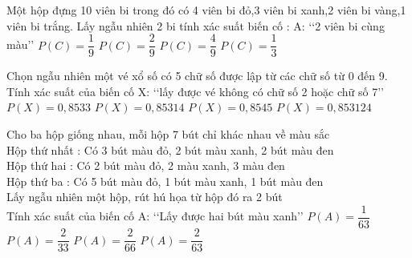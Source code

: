 \begin{ex}
Một hộp đựng 10 viên bi trong đó có 4 viên bi đỏ,3 viên bi xanh,2 viên bi vàng,1 viên bi trắng. Lấy ngẫu nhiên 2 bi tính xác suất biến cố : A: \lq\lq 2 viên bi cùng màu\rq\rq 
\choice
{$P(C)=\dfrac{1}{9}$}
{\True $P(C)=\dfrac{2}{9}$}
{$P(C)=\dfrac{4}{9}$}
{$P(C)=\dfrac{1}{3}$}
\end{ex}
\begin{ex}
Chọn ngẫu nhiên một vé xổ số có 5 chữ số được lập từ các chữ số từ 0 đến 9. Tính xác suất của biến cố X: \lq\lq lấy được vé không có chữ số 2 hoặc chữ số 7\rq\rq 
\choice
{\True $P(X)=0{,}8533$}
{$P(X)=0{,}85314$}
{$P(X)=0{,}8545$}
{$P(X)=0{,}853124$}
\end{ex}
\begin{ex}
Cho ba hộp giống nhau, mỗi hộp 7 bút chỉ khác nhau về màu sắc\\
Hộp thứ nhất : Có 3 bút màu đỏ, 2 bút màu xanh, 2 bút màu đen\\
Hộp thứ hai : Có 2 bút màu đỏ, 2 màu xanh, 3 màu đen\\
Hộp thứ ba : Có 5 bút màu đỏ, 1 bút màu xanh, 1 bút màu đen\\
Lấy ngẫu nhiên một hộp, rút hú họa từ hộp đó ra 2 bút\\
Tính xác suất của biến cố A: \lq\lq Lấy được hai bút màu xanh\rq\rq 
\choice
{$P(A)=\dfrac{1}{63}$}
{$P(A)=\dfrac{2}{33}$}
{\True $P(A)=\dfrac{2}{66}$}
{$P(A)=\dfrac{2}{63}$}
\end{ex}
